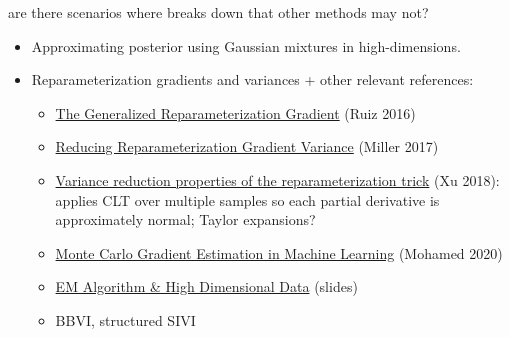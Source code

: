 \documentclass[10pt]{article}
\begin{document}
\todo are there scenarios where \uivi breaks down that other \vi methods may not?

\begin{itemize}

\item
Approximating posterior using Gaussian mixtures in high-dimensions.

\item
Reparameterization gradients and variances + other relevant references:
\begin{itemize}
\item
\href{https://arxiv.org/pdf/1610.02287.pdf}{The Generalized Reparameterization Gradient} (Ruiz 2016)
\item
\href{https://proceedings.neurips.cc/paper/2017/file/325995af77a0e8b06d1204a171010b3a-Paper.pdf}{Reducing Reparameterization Gradient Variance} (Miller 2017)
\item
\href{https://arxiv.org/pdf/1809.10330.pdf}{Variance reduction properties of the reparameterization trick} (Xu 2018): applies CLT over multiple samples so each partial derivative is approximately normal; Taylor expansions?
\item
\href{https://jmlr.org/papers/volume21/19-346/19-346.pdf}{Monte Carlo Gradient Estimation in Machine Learning} (Mohamed 2020)
\item
\href{http://www.svcl.ucsd.edu/courses/ece175/handouts/slides11.pdf}{EM Algorithm \& High Dimensional Data} (slides)
\item
BBVI, structured SIVI
\end{itemize}


\end{itemize}
\end{document}
